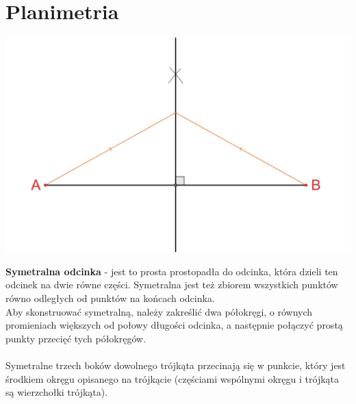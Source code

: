 \documentclass[14pt,a4paper]{extarticle}
\begin{document}
\newpage

\section{Planimetria}
\begin{center}\includegraphics[scale=0.5]{geometria/symetralna odcinka.png}\end{center}
\noindent \textbf{Symetralna odcinka} - jest to prosta prostopadła do odcinka, która dzieli ten odcinek
na dwie równe części. Symetralna jest też zbiorem wszystkich punktów równo odległych od punktów na końcach
odcinka.\\
\noindent Aby skonstruować symetralną, należy zakreślić dwa półokręgi, o równych promieniach większych od połowy długości
odcinka, a następnie połączyć prostą punkty przecięć tych półokręgów.\\\\
\noindent Symetralne trzech boków dowolnego trójkąta przecinają się w punkcie, który jest środkiem okręgu opisanego
na trójkącie (częściami wspólnymi okręgu i trójkąta są wierzchołki trójkąta).
\end{document}
